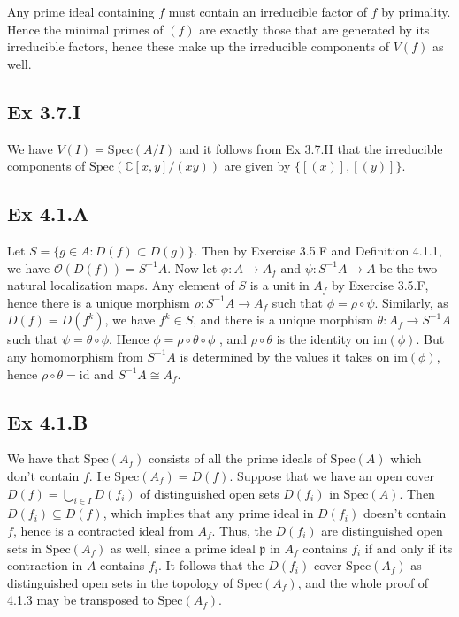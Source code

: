 \documentclass{article}
\theoremstyle{definition}
\newcommand{\C}{\mathbb{C}}
\newcommand{\Spec}{\text{Spec}}
\newcommand{\im}{\text{im}}
\newcommand{\id}{\text{id}}
\begin{document}
Any prime ideal containing $f$ must contain an irreducible factor of $f$ by
primality. Hence the minimal primes of $(f)$ are exactly those that are
generated by its irreducible factors, hence these make up the irreducible
components of $V(f)$ as well.

\subsection*{Ex 3.7.I}

We have $V(I) = \Spec(A/I)$ and it follows from Ex 3.7.H that the irreducible
components of $\Spec(\C[x, y]/(xy))$ are given by $\{[(x)], [(y)]\}$.

\subsection*{Ex 4.1.A}

Let $S = \{g \in A : D(f) \subset D(g) \}$. Then by Exercise 3.5.F and
Definition 4.1.1, we have $\mathcal{O}(D(f)) = S^{-1} A$. Now let $\phi : A \to
	A_f$ and $\psi : S^{-1}A \to A$ be the two natural localization maps. Any
element of $S$ is a unit in $A_f$ by Exercise 3.5.F, hence there is a unique
morphism $\rho : S^{-1}A \to A_f$ such that $\phi = \rho \circ \psi$.
Similarly, as $D(f) = D(f^k)$, we have $f^k \in S$, and there is a unique
morphism $\theta : A_f \to S^{-1}A$ such that $\psi = \theta \circ \phi$. Hence
$\phi = \rho \circ \theta \circ \phi$ , and $\rho \circ \theta$ is the identity
on $\im(\phi)$. But any homomorphism from $S^{-1}A$ is determined by the values
it takes on $\im(\phi)$, hence $\rho \circ \theta = \id$ and $S^{-1}A \cong
	A_f$.

\subsection*{Ex 4.1.B}

We have that $\Spec(A_{f})$ consists of all the prime ideals of $\Spec(A)$
which don't contain $f$. I.e $\Spec(A_{f}) = D(f)$. Suppose that we have an
open cover $D(f) = \bigcup_{i \in I} D(f_i)$ of distinguished open sets
$D(f_i)$ in $\Spec(A)$. Then $D(f_i) \subseteq D(f)$, which implies that any
prime ideal in $D(f_i)$ doesn't contain $f$, hence is a contracted ideal from
$A_f$. Thus, the $D(f_i)$ are distinguished open sets in $\Spec(A_f)$ as well,
since a prime ideal $\mathfrak{p}$ in $A_f$ contains $f_i$ if and only if its
contraction in $A$ contains $f_i$. It follows that the $D(f_i)$ cover
$\Spec(A_f)$ as distinguished open sets in the topology of $\Spec(A_f)$, and
the whole proof of 4.1.3 may be transposed to $\Spec(A_f)$.
\end{document}
